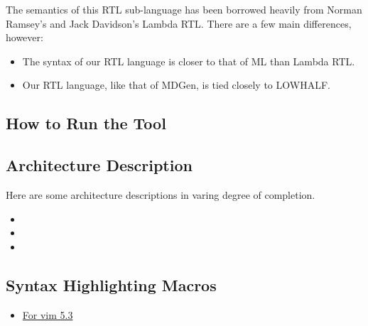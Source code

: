    The semantics of this RTL sub-language has been borrowed heavily from
Norman Ramsey's and Jack Davidson's Lambda RTL.  There
are a few main differences, however: 
\begin{itemize}
  \item The syntax of our RTL language 
        is closer to that of ML than Lambda RTL.  
  \item Our RTL language, like that of MDGen, is tied closely to LOWHALF.
\end{itemize}

\subsection{How to Run the Tool}

\subsection{Architecture Description}
Here are some architecture descriptions in varing degree of completion.

\begin{itemize}
 \item {} 
 \item {} 
 \item {} 
\end{itemize}

\subsection{ Syntax Highlighting Macros }

\begin{itemize}
  \item \href{md.vim}{For vim 5.3}
\end{itemize}
